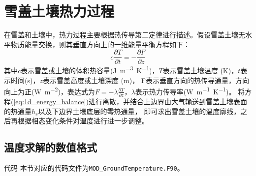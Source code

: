 \chapter{雪盖土壤热力过程}


在雪盖和土壤中，热力过程主要根据热传导第二定律进行描述。假设雪盖土壤无水平物质能量交换，则其垂直方向上的一维能量平衡方程如下：
\begin{equation}\label{eq:1d_energy_balance}
c \frac{\partial T}{\partial t}=-\frac{\partial F}{\partial z}
\end{equation}
其中$c$表示雪盖或土壤的体积热容量(\unit{J.m^{-3}.K^{-1}})，$T$表示雪盖土壤温度 (K)，$t$表示时间(s)，$z$表示雪盖高度或土壤深度 (m)，
F表示垂直方向的热传导通量，方向向上为正(\unit{W.m^{-2}})，表达式为$F=-\lambda\frac{\partial T}{\partial z}$，$\lambda$表示热力传导率(\unit{W.m^{-1}.K^{-1}})。
将方程(\ref{eq:1d_energy_balance})进行离散，并结合上边界由大气输送到雪盖土壤表面的热通量$h_s$以及下边界土壤底层的零热通量，
即可求出雪盖土壤的温度廓线，之后再根据相态变化条件对温度进行进一步调整。


\section{温度求解的数值格式}\label{温度求解的数值格式}

\begin{mymdframed}{代码}
本节对应的代码文件为\texttt{MOD\_GroundTemperature.F90}。
\end{mymdframed}

